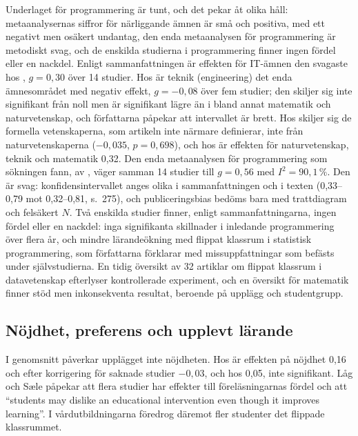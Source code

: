 Underlaget för programmering är tunt, och det pekar åt olika håll:
metaanalysernas siffror för närliggande ämnen är små och positiva, med
ett negativt men osäkert undantag, den enda metaanalysen för
programmering är metodiskt svag, och de enskilda studierna i
programmering finner ingen fördel eller en nackdel.  Enligt
sammanfattningen är effekten för IT-ämnen den svagaste hos
\textcite{Strelan2020}, \(g = 0{,}30\) över 14 studier.  Hos
\textcite[809--810]{Cheng2019} är teknik
(\foreignlanguage{english}{engineering}) det enda ämnesområdet med
negativ effekt, \(g = -0{,}08\) över fem
studier; den skiljer sig inte signifikant från noll men är signifikant
lägre än i bland annat matematik och naturvetenskap, och författarna
påpekar att intervallet är brett.  Hos
\textcite[tabell~4, s.~11]{vanAlten2019} skiljer sig de formella
vetenskaperna, som artikeln inte närmare definierar, inte från
naturvetenskaperna (\(-0{,}035\), \(p = 0{,}698\)), och hos
\textcite[7]{LagSaele2019} är effekten för naturvetenskap, teknik och
matematik 0,32.  Den enda metaanalysen för programmering som sökningen
fann, av \textcite[267, 276]{AlmassriZaharudin2023}, väger samman 14
studier till \(g = 0{,}56\) med \(I^2 = 90{,}1\,\%\).  Den är svag:
konfidensintervallet anges olika i sammanfattningen och i texten
(0,33--0,79 mot 0,32--0,81, s.~275), och publiceringsbias bedöms bara med
trattdiagram och felsäkert \(N\).  Två enskilda studier finner, enligt
sammanfattningarna, ingen fördel eller en nackdel: inga signifikanta
skillnader i inledande programmering över flera år\autocite{Tyler2018},
och mindre lärandeökning med flippat klassrum i statistisk programmering,
som författarna förklarar med missuppfattningar som befästs under
självstudierna\autocite{Liu2026}.  En tidig översikt av 32 artiklar om
flippat klassrum i datavetenskap efterlyser kontrollerade
experiment\autocite{Giannakos2014}, och en översikt för matematik finner
stöd men inkonsekventa resultat, beroende på upplägg och
studentgrupp\autocite{Jones2026}.

\subsection{Nöjdhet, preferens och upplevt lärande}

I genomsnitt påverkar upplägget inte nöjdheten.  Hos
\textcite[9]{LagSaele2019} är effekten på nöjdhet 0,16 och efter
korrigering för saknade studier \(-0{,}03\), och hos
\textcite[tabell~3, s.~10]{vanAlten2019} 0,05, inte signifikant.  Låg och
Sæle påpekar att flera studier har effekter till föreläsningarnas fördel
och att \enquote{students may dislike an educational intervention even
though it improves learning}\autocite[12]{LagSaele2019}.  I
vårdutbildningarna föredrog däremot fler studenter det flippade
klassrummet\autocite{HewLo2018}.

